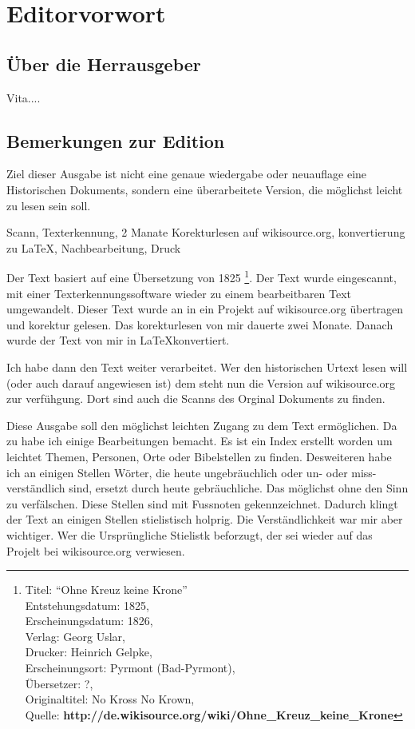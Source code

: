 \part{Editorvorwort}

\chapter{Über die Herrausgeber}
Vita....

\chapter{Bemerkungen zur Edition}

Ziel dieser Ausgabe ist nicht eine genaue wiedergabe oder neuauflage eine
Historischen Dokuments, sondern eine überarbeitete Version, die möglichst
leicht zu lesen sein soll.

Scann, Texterkennung, 2 Manate Korekturlesen auf wikisource.org, konvertierung
zu LaTeX, Nachbearbeitung, Druck



Der Text basiert auf eine Übersetzung von 1825
\footnote{
Titel: "`Ohne Kreuz keine Krone"' \\
Entstehungsdatum: 1825, \\
Erscheinungsdatum: 1826, \\
Verlag: Georg Uslar, \\
Drucker: Heinrich Gelpke, \\
Erscheinungsort: Pyrmont (Bad-Pyrmont),\\
Übersetzer: ?, \\
Originaltitel: No Kross No Krown, \\
Quelle: \textbf{http://de.wikisource.org/wiki/Ohne\_Kreuz\_keine\_Krone}}. Der
Text wurde eingescannt, mit einer Texterkennungssoftware wieder zu einem
bearbeitbaren Text umgewandelt. Dieser Text wurde an in ein Projekt auf
wikisource.org übertragen und korektur gelesen. Das korekturlesen von mir
dauerte zwei Monate. Danach wurde der Text von mir in \LaTeX konvertiert.

Ich habe dann den Text weiter verarbeitet. Wer den historischen Urtext lesen
will (oder auch darauf angewiesen ist) dem steht nun die Version auf
wikisource.org zur verfühgung. Dort sind auch die Scanns des Orginal
Dokuments zu finden.

Diese Ausgabe soll den möglichst leichten Zugang zu dem Text ermöglichen. Da
zu habe ich einige Bearbeitungen bemacht. Es ist ein Index erstellt worden
um leichtet Themen, Personen, Orte oder Bibelstellen zu finden. Desweiteren
habe ich an einigen Stellen Wörter, die heute ungebräuchlich oder un- oder miss-
verständlich sind, ersetzt durch heute gebräuchliche. Das möglichst ohne den
Sinn zu verfälschen. Diese Stellen sind mit Fussnoten gekennzeichnet. Dadurch
klingt der Text an einigen Stellen stielistisch holprig. Die Verständlichkeit
war mir aber wichtiger. Wer die Ursprüngliche Stielistk beforzugt, der sei
wieder auf das Projelt bei wikisource.org verwiesen.

